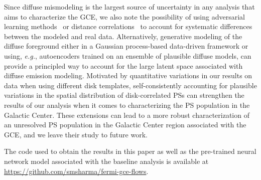\documentclass[prd,aps,10pt,nofootinbib,twocolumn,superscriptaddress,preprintnumbers,balancelastpage,longbibliography]{revtex4-1}
\begin{document}
Since diffuse mismodeling is the largest source of uncertainty in any analysis that aims to characterize the GCE, we also note the possibility of using adversarial learning methods~\cite{Louppe:2016ylz} or distance correlations~\cite{Kasieczka:2020yyl} to account for systematic differences between the modeled and real \Fermi data. Alternatively, generative modeling of the diffuse foreground either in a Gaussian process-based data-driven framework or using, \emph{e.g.}, autoencoders trained on an ensemble of plausible diffuse models, can provide a principled way to account for the large latent space associated with diffuse emission modeling. Motivated by quantitative variations in our results on \Fermi data when using different disk templates, self-consistently accounting for plausible variations in the spatial distribution of disk-correlated PSs can strengthen the results of our analysis when it comes to characterizing the PS population in the Galactic Center. 
These extensions can lead to a more robust characterization of an unresolved PS population in the Galactic Center region associated with the GCE, and we leave their study to future work.

The code used to obtain the results in this paper as well as the pre-trained neural network model associated with the baseline analysis is available at \url{https://github.com/smsharma/fermi-gce-flows}.

\vspace{.2cm}
\end{document}
